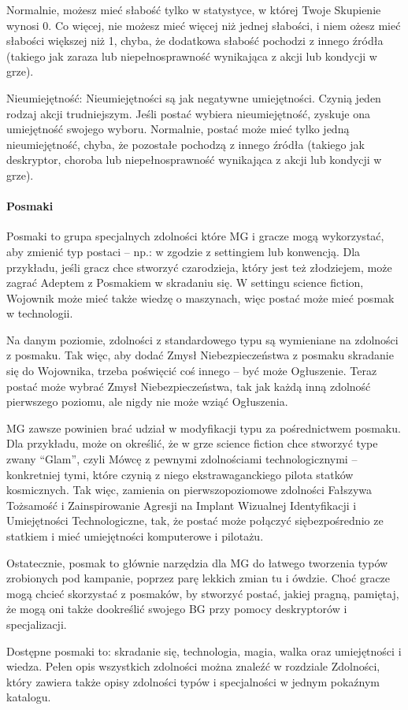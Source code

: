 Normalnie, możesz mieć słabość tylko w statystyce, w której Twoje Skupienie wynosi 0. Co więcej, nie możesz mieć więcej niż jednej słabości, i niem ożesz mieć słabości większej niż 1, chyba, że dodatkowa słabość pochodzi z innego źródła (takiego jak zaraza lub niepełnosprawność wynikająca z akcji lub kondycji w grze).

Nieumiejętność: Nieumiejętności są jak negatywne umiejętności. Czynią jeden rodzaj akcji trudniejszym. Jeśli postać wybiera nieumiejętność, zyskuje ona umiejętność swojego wyboru. Normalnie, postać może mieć tylko jedną nieumiejętność, chyba, że pozostałe pochodzą z innego źródła (takiego jak deskryptor, choroba lub niepełnosprawność wynikająca z akcji lub kondycji w grze).

\paragraph{Posmaki}

Posmaki to grupa specjalnych zdolności które MG i gracze mogą wykorzystać, aby zmienić typ postaci – np.: w zgodzie z settingiem lub konwencją. Dla przykładu, jeśli gracz chce stworzyć czarodzieja, który jest też złodziejem, może zagrać Adeptem z Posmakiem w skradaniu się. W settingu science fiction, Wojownik może mieć także wiedzę o maszynach, więc postać może mieć posmak w technologii. 

Na danym poziomie, zdolności z standardowego typu są wymieniane na zdolności z posmaku. Tak więc, aby dodać Zmysł Niebezpieczeństwa z posmaku skradanie się do Wojownika, trzeba poświęcić coś innego – być może Ogłuszenie. Teraz postać może wybrać Zmysł Niebezpieczeństwa, tak jak każdą inną zdolność pierwszego poziomu, ale nigdy nie może wziąć Ogłuszenia.

MG zawsze powinien brać udział w modyfikacji typu za pośrednictwem posmaku. Dla przykładu, może on określić, że w grze science fiction chce stworzyć type zwany “Glam”, czyli Mówcę z pewnymi zdolnościami technologicznymi – konkretniej tymi, które czynią z niego ekstrawaganckiego pilota statków kosmicznych. Tak więc, zamienia on pierwszopoziomowe zdolności Fałszywa Tożsamość i Zainspirowanie Agresji na Implant Wizualnej Identyfikacji i Umiejętności Technologiczne, tak, że postać może połączyć siębezpośrednio ze statkiem i mieć umiejętności komputerowe i pilotażu.

Ostatecznie, posmak to głównie narzędzia dla MG do łatwego tworzenia typów zrobionych pod kampanie, poprzez parę lekkich zmian tu i ówdzie. Choć gracze mogą chcieć skorzystać z posmaków, by stworzyć postać, jakiej pragną, pamiętaj, że mogą oni także dookreślić swojego BG przy pomocy deskryptorów i specjalizacji. 

Dostępne posmaki to: skradanie się, technologia, magia, walka oraz umiejętności i wiedza.
Pełen opis wszystkich zdolności można znaleźć w rozdziale Zdolności, który zawiera także opisy zdolności typów i specjalności w jednym pokaźnym katalogu.

